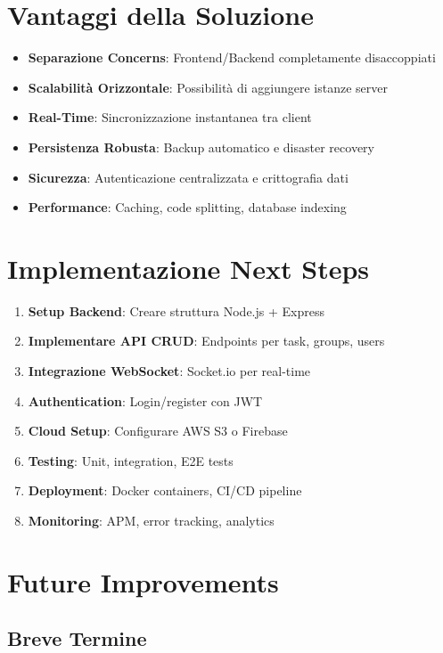 \documentclass[12pt,a4paper]{report}
\begin{document}
\section{Vantaggi della Soluzione}

\begin{itemize}
    \item \textbf{Separazione Concerns}: Frontend/Backend completamente disaccoppiati
    \item \textbf{Scalabilità Orizzontale}: Possibilità di aggiungere istanze server
    \item \textbf{Real-Time}: Sincronizzazione instantanea tra client
    \item \textbf{Persistenza Robusta}: Backup automatico e disaster recovery
    \item \textbf{Sicurezza}: Autenticazione centralizzata e crittografia dati
    \item \textbf{Performance}: Caching, code splitting, database indexing
\end{itemize}

\section{Implementazione Next Steps}

\begin{enumerate}
    \item \textbf{Setup Backend}: Creare struttura Node.js + Express
    \item \textbf{Implementare API CRUD}: Endpoints per task, groups, users
    \item \textbf{Integrazione WebSocket}: Socket.io per real-time
    \item \textbf{Authentication}: Login/register con JWT
    \item \textbf{Cloud Setup}: Configurare AWS S3 o Firebase
    \item \textbf{Testing}: Unit, integration, E2E tests
    \item \textbf{Deployment}: Docker containers, CI/CD pipeline
    \item \textbf{Monitoring}: APM, error tracking, analytics
\end{enumerate}

\section{Future Improvements}

\subsection{Breve Termine}
\end{document}
